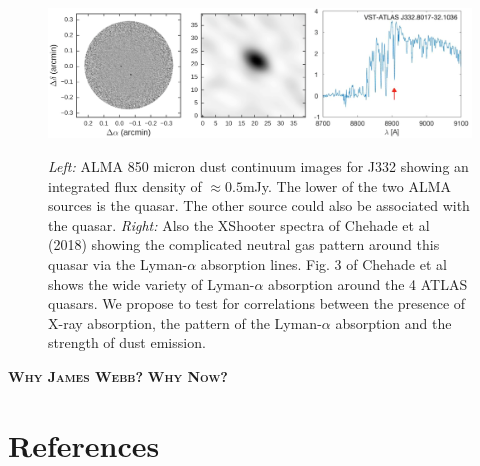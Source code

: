 \hspace{-7.5cm}
\vspace{-14pt}
\begin{figure}[h]
  \begin{center}
    \hspace{-0.5cm}
    \includegraphics[width=\textwidth]{Figures/j332_alma_lyA.png}
    \vspace{-10pt}
    \caption{\footnotesize
     {\it Left:} ALMA 850 micron dust continuum images for J332 showing an
      integrated flux density of $\approx0.5$mJy. The lower of the two ALMA sources is the quasar. The other 
      source could also be associated with the quasar. 
{\it Right:} Also the XShooter spectra of
      Chehade et al (2018) showing the complicated neutral gas pattern around
      this quasar via the Lyman-$\alpha$ absorption lines. Fig. 3 of Chehade et
      al shows the wide variety of Lyman-$\alpha$ absorption around the 4 ATLAS
      quasars. We propose to test for correlations between the presence of
      X-ray absorption, the pattern  of the Lyman-$\alpha$ absorption and
      the strength of dust emission.}
\vspace{-14pt}
\label{fig:alma}
  \end{center}
\end{figure}
\normalsize


\smallskip
\smallskip
\noindent
{\bfseries  \textsc{Why James Webb?}}
{\bfseries  \textsc{Why Now?}}


\vspace{-34pt}
\section*{References}




%

